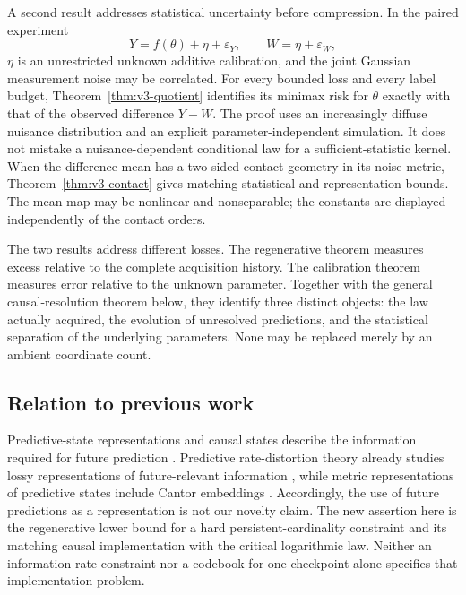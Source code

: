 A second result addresses statistical uncertainty before compression.
In the paired experiment
\[
 Y=f(\theta)+\eta+\varepsilon_Y,\qquad
 W=\eta+\varepsilon_W,
\]
$\eta$ is an unrestricted unknown additive calibration, and the joint
Gaussian measurement noise may be correlated. For every bounded loss
and every label budget, Theorem~\ref{thm:v3-quotient} identifies its
minimax risk for $\theta$ exactly with that of the observed difference
$Y-W$. The proof uses an increasingly diffuse nuisance distribution and
an explicit parameter-independent simulation. It does not mistake a
nuisance-dependent conditional law for a sufficient-statistic kernel.
When the difference mean has a two-sided contact geometry in its noise
metric, Theorem~\ref{thm:v3-contact} gives matching statistical and
representation bounds. The mean map may be nonlinear and nonseparable;
the constants are displayed independently of the contact orders.

The two results address different losses. The regenerative theorem
measures excess relative to the complete acquisition history. The
calibration theorem measures error relative to the unknown parameter.
Together with the general causal-resolution theorem below, they identify
three distinct objects: the law actually acquired, the evolution of
unresolved predictions, and the statistical separation of the underlying
parameters. None may be replaced merely by an ambient coordinate count.

\subsection{Relation to previous work}
Predictive-state representations and causal states describe the information
required for future prediction
\cite{ShaliziCrutchfield2001,LittmanSuttonSingh2002,BarnettCrutchfield2015}.
Predictive rate-distortion theory already studies lossy representations of
future-relevant information \cite{MarzenCrutchfield2016}, while metric
representations of predictive states include Cantor embeddings
\cite{LoomisCrutchfield2022}. Accordingly, the use of future predictions
as a representation is not our novelty claim. The new assertion here is
the regenerative lower bound for a hard persistent-cardinality constraint
and its matching causal implementation with the critical logarithmic law.
Neither an information-rate constraint nor a codebook for one checkpoint
alone specifies that implementation problem.

